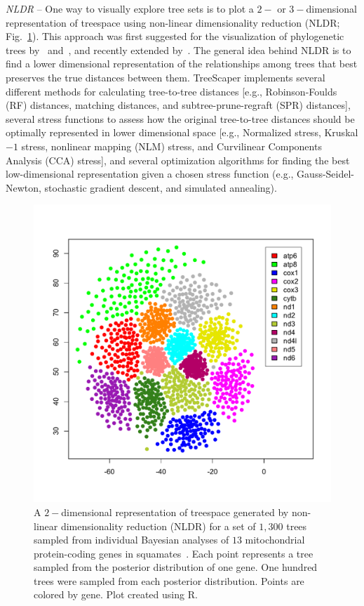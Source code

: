 \documentclass[11pt]{article}
\begin{document}
{\it NLDR} -- One way to visually explore tree sets is to plot a $2-$ or $3-$dimensional representation of treespace using non-linear dimensionality reduction (NLDR; Fig.~\ref{fig1}). This approach was first suggested for the visualization of phylogenetic trees by~\citealp{AK:2002} and~\citealp{HHJA:2005}, and recently extended by~\citealp{WHG:2017}. The general idea behind NLDR is to find a lower dimensional representation of the relationships among trees that best preserves the true distances between them. TreeScaper implements several different methods for calculating tree-to-tree distances [e.g., Robinson-Foulds (RF) distances, matching distances, and subtree-prune-regraft (SPR) distances], several stress functions to assess how the original tree-to-tree distances should be optimally represented in lower dimensional space [e.g., Normalized stress, Kruskal$-1$ stress, nonlinear mapping (NLM) stress, and Curvilinear Components Analysis (CCA) stress], and several optimization algorithms for finding the best low-dimensional representation given a chosen stress function (e.g., Gauss-Seidel-Newton, stochastic gradient descent, and simulated annealing). \\


\begin{figure}[thbp!]\centering
\includegraphics[scale=0.5]{imagesForManual/Figure1.pdf}
\caption{A $2-$dimensional representation of treespace generated by non-linear dimensionality reduction (NLDR) for a set of $1,300$ trees sampled from individual Bayesian analyses of $13$ mitochondrial protein-coding genes in squamates~\citep{CdKKGNNJPP:2009}. Each point represents a tree sampled from the posterior distribution of one gene. One hundred trees were sampled from each posterior distribution. Points are colored by gene. Plot created using R.}\label{fig1}
\end{figure}
	
\end{document}
